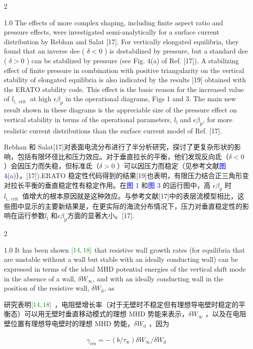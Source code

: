 \documentclass[utf8]{ctexart}
\newcommand\enzhbox[2]{
  	\quad\par \begin{paracol}{2} \colseprulecolor{black} 
  		\begin{spacing}{1.0}
  			\footnotesize  #1
  		\end{spacing}
  		\switchcolumn[1] 
  		#2
  	\end{paracol} \quad\par
  }
\begin{document}
\begin{sloppypar}
  
 
\enzhbox{  The effects of more complex shaping, including finite aspect ratio and pressure effects, were investigated semi-analytically for a surface current distribution by Rebhan and Salat \textcolor{green!50!black}{[17]}. For vertically elongated equilibria, they found that an inverse dee ( $\delta<0$ ) is destabilized by pressure, but a standard dee ( $\delta>0$ ) can be stabilized by pressure (see Fig. 4(a) of Ref. \textcolor{green!50!black}{[17]}). A stabilizing effect of finite pressure in combination with positive triangularity on the vertical stability of elongated equilibria is also indicated by the results \textcolor{green!50!black}{[19]} obtained with the ERATO stability code. This effect is the basic reason for the increased value of $l_{\mathrm{i}, \text { crit }}$ at high $\epsilon \beta_{\mathrm{p}}$ in the operational diagrams, Figs 1 and 3. The main new result shown in these diagrams is the appreciable size of the pressure effect on vertical stability in terms of the operational parameters, $l_{\mathrm{i}}$ and $\epsilon \beta_{\mathrm{p}}$, for more realistic current distributions than the surface current model of Ref. \textcolor{green!50!black}{[17]}.}{
Rebhan 和 Salat\textcolor{green!50!black}{[17]}对表面电流分布进行了半分析研究，探讨了更复杂形状的影响，包括有限环径比和压力效应。对于垂直拉长的平衡，他们发现反向氐（$\delta<0$  ）会因压力而失稳，但标准氐（$\delta>0$  ）可以因压力而稳定（见参考文献\textcolor{blue}{图 4}(a)）。\textcolor{green!50!black}{[17]}).ERATO 稳定性代码得到的结果\textcolor{green!50!black}{[19]}也表明，有限压力结合正三角形变对拉长平衡的垂直稳定性有稳定作用。在\textcolor{blue}{图 1} 和\textcolor{blue}{图 3} 的运行图中，高 $\epsilon \beta_{\mathrm{p}}$  时 $l_{\mathrm{i}, \text { crit }}$  值增大的根本原因就是这种效应。与参考文献\textcolor{green!50!black}{[17]}中的表层流模型相比，这些图中显示的主要新结果是，在更实际的海流分布情况下，压力对垂直稳定性的影响在运行参数$l_{\mathrm{i}}$ 和$\epsilon \beta_{\mathrm{p}}$方面的显著大小。\textcolor{green!50!black}{[17]}.}
  
 
\enzhbox{  It has been shown $\textcolor{green!50!black}{[14,18]}$ that resistive wall growth rates (for equilibria that are unstable without a wall but stable with an ideally conducting wall) can be expressed in terms of the ideal MHD potential energies of the vertical shift mode in the absence of a wall, $\delta W_{\infty}$, and with an ideally conducting wall in the position of the resistive wall, $\delta W_{\mathrm{d}}$, as\\}{
研究表明$\textcolor{green!50!black}{[14,18]}$ ，电阻壁增长率（对于无壁时不稳定但有理想导电壁时稳定的平衡态）可以用无壁时垂直移动模式的理想 MHD 势能来表示，$\delta W_{\infty}$ ，以及在电阻壁位置有理想导电壁时的理想 MHD 势能，$\delta W_{\mathrm{d}}$ ，因为}
 \begin{align*}
 	 \gamma_{\mathrm{res}}=-\left(b / \tau_{\mathrm{w}}\right) \delta W_{\infty} / \delta W_{\mathrm{d}}
 \end{align*}
 

\end{sloppypar}
\end{document}
